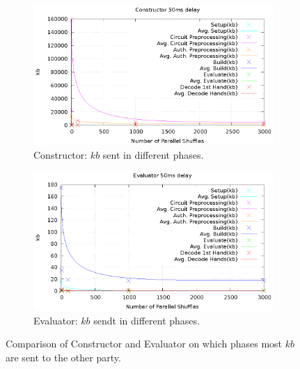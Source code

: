 \begin{figure}
    \label{fig:mesurement_kb}
    \centering

    \begin{subfigure}{\textwidth}
        \label{fig:const_kb_plot}
        \includegraphics[width=\textwidth]{figurs/const_kb_plot.eps}
        \caption{Constructor: $kb$ sent in different phases.}
    \end{subfigure}

    \vspace*{1cm}

    \begin{subfigure}{\textwidth}
        \label{fig:eval_kb_plot}
        \includegraphics[width=\textwidth]{figurs/eval_kb_plot.eps}
        \caption{Evaluator: $kb$ sendt in different phases.}
    \end{subfigure}

\caption{Comparison of Constructor and Evaluator on which phases most $kb$ are sent to the other party.}
\end{figure}


